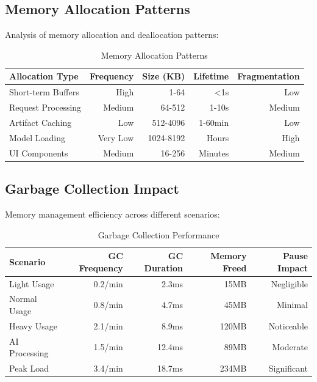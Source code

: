 \subsection*{Memory Allocation Patterns}

Analysis of memory allocation and deallocation patterns:

\begin{table}[ht]
\centering
\caption{Memory Allocation Patterns}
\label{tab:memory-allocation}
\begin{tabular}{@{}lrrrr@{}}
\toprule
\textbf{Allocation Type} & \textbf{Frequency} & \textbf{Size (KB)} & \textbf{Lifetime} & \textbf{Fragmentation} \\
\midrule
Short-term Buffers & High & 1-64 & <1s & Low \\
Request Processing & Medium & 64-512 & 1-10s & Medium \\
Artifact Caching & Low & 512-4096 & 1-60min & Low \\
Model Loading & Very Low & 1024-8192 & Hours & High \\
UI Components & Medium & 16-256 & Minutes & Medium \\
\bottomrule
\end{tabular}
\end{table}

\subsection*{Garbage Collection Impact}

Memory management efficiency across different scenarios:

\begin{table}[ht]
\centering
\caption{Garbage Collection Performance}
\label{tab:gc-performance}
\begin{tabular}{@{}lrrrr@{}}
\toprule
\textbf{Scenario} & \textbf{GC Frequency} & \textbf{GC Duration} & \textbf{Memory Freed} & \textbf{Pause Impact} \\
\midrule
Light Usage & 0.2/min & 2.3ms & 15MB & Negligible \\
Normal Usage & 0.8/min & 4.7ms & 45MB & Minimal \\
Heavy Usage & 2.1/min & 8.9ms & 120MB & Noticeable \\
AI Processing & 1.5/min & 12.4ms & 89MB & Moderate \\
Peak Load & 3.4/min & 18.7ms & 234MB & Significant \\
\bottomrule
\end{tabular}
\end{table}

